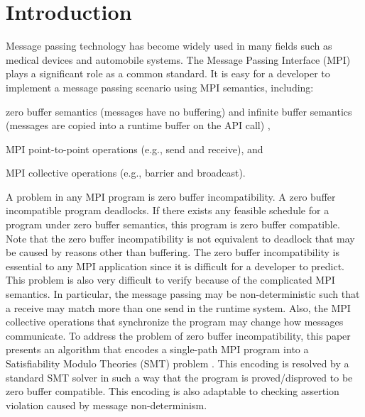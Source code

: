 \section{Introduction}
Message passing technology has become widely used in many fields such as medical devices and automobile systems. The Message Passing Interface (MPI) plays a significant role as a common standard. It is easy for a developer to implement a message passing scenario using MPI semantics, including:

\begin{compactitem}
\item zero buffer semantics (messages have no buffering) and infinite buffer semantics (messages are copied into a runtime buffer on the API call) \cite{DBLP:conf/fm/VakkalankaVGK09},
\item MPI point-to-point operations (e.g., send and receive), and
\item MPI collective operations (e.g., barrier and broadcast).
\end{compactitem}

A problem in any MPI program is zero buffer incompatibility. A zero buffer incompatible program deadlocks. If there exists any feasible schedule for a program under zero buffer semantics, this program is zero buffer compatible. Note that the zero buffer incompatibility is not equivalent to deadlock that may be caused by reasons other than buffering. The zero buffer incompatibility is essential to any MPI application since it is difficult for a developer to predict. 
This problem is also very difficult to verify because of the complicated MPI semantics.
In particular, the message passing may be non-deterministic such that a receive may match more than one send in the runtime system. Also, the MPI collective operations that synchronize the program may change how messages communicate. To address the problem of zero buffer incompatibility, this paper presents an algorithm that encodes a single-path MPI program into a Satisfiability Modulo Theories (SMT) problem \cite{barrett2008satisfiability}. This encoding is resolved by a standard SMT solver in such a way that the program is proved/disproved to be zero buffer compatible. This encoding is also adaptable to checking assertion violation caused by message non-determinism.

